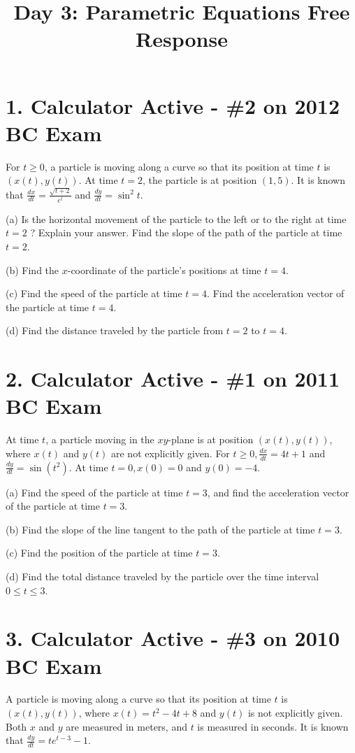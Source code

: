 \documentclass[10pt]{article}
\title{Day 3: Parametric Equations Free Response }
\author{}
\date{}
\begin{document}
\maketitle
\section*{1. Calculator Active - \#2 on 2012 BC Exam}
For $t \geq 0$, a particle is moving along a curve so that its position at time $t$ is $(x(t), y(t))$. At time $t=2$, the particle is at position $(1,5)$. It is known that $\frac{d x}{d t}=\frac{\sqrt{t+2}}{e^{t}}$ and $\frac{d y}{d t}=\sin ^{2} t$.

(a) Is the horizontal movement of the particle to the left or to the right at time $t=2$ ? Explain your answer. Find the slope of the path of the particle at time $t=2$.

(b) Find the $x$-coordinate of the particle's positions at time $t=4$.

(c) Find the speed of the particle at time $t=4$. Find the acceleration vector of the particle at time $t=4$.

(d) Find the distance traveled by the particle from $t=2$ to $t=4$.

\section*{2. Calculator Active - \#1 on 2011 BC Exam}
At time $t$, a particle moving in the $x y$-plane is at position $(x(t), y(t))$, where $x(t)$ and $y(t)$ are not explicitly given. For $t \geq 0, \frac{d x}{d t}=4 t+1$ and $\frac{d y}{d t}=\sin \left(t^{2}\right)$. At time $t=0, x(0)=0$ and $y(0)=-4$.

(a) Find the speed of the particle at time $t=3$, and find the acceleration vector of the particle at time $t=3$.

(b) Find the slope of the line tangent to the path of the particle at time $t=3$.

(c) Find the position of the particle at time $t=3$.

(d) Find the total distance traveled by the particle over the time interval $0 \leq t \leq 3$.

\section*{3. Calculator Active - \#3 on 2010 BC Exam}
A particle is moving along a curve so that its position at time $t$ is $(x(t), y(t))$, where $x(t)=t^{2}-4 t+8$ and $y(t)$ is not explicitly given. Both $x$ and $y$ are measured in meters, and $t$ is measured in seconds. It is known that $\frac{d y}{d t}=t e^{t-3}-1$.
\end{document}
